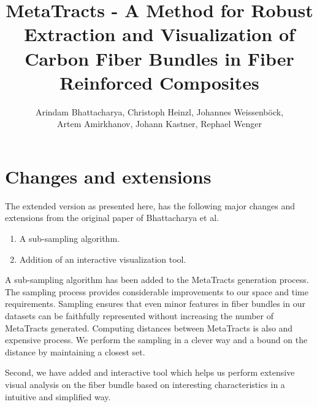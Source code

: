 \documentclass[]{article}
\title{MetaTracts - A Method for Robust Extraction and Visualization of Carbon Fiber Bundles in Fiber Reinforced Composites}
\author{Arindam Bhattacharya, Christoph Heinzl, Johannes Weissenb{\"o}ck,\\Artem Amirkhanov,
	Johann Kastner, Rephael Wenger}
\begin{document}
\maketitle

\section{Changes and extensions}
The extended version as presented here, has the following major changes and extensions from the original paper of Bhattacharya et al.~\cite{Bhattacharya2015} 
\begin{enumerate}
	\item A sub-sampling algorithm.
	\item Addition of an interactive visualization tool.
\end{enumerate}

A sub-sampling algorithm has been added to the MetaTracts generation process. The sampling process provides considerable improvements to our space and time requirements. Sampling ensures that even minor features in fiber bundles in our datasets can be faithfully represented without increasing the number of MetaTracts generated.
Computing distances between MetaTracts is also and expensive process. We perform the sampling in a clever way and a bound on the distance by maintaining a closest set.

 
Second, we have added and interactive tool which helps us perform extensive  visual analysis on the fiber bundle based on interesting characteristics in a intuitive and simplified way.  




\end{document}
